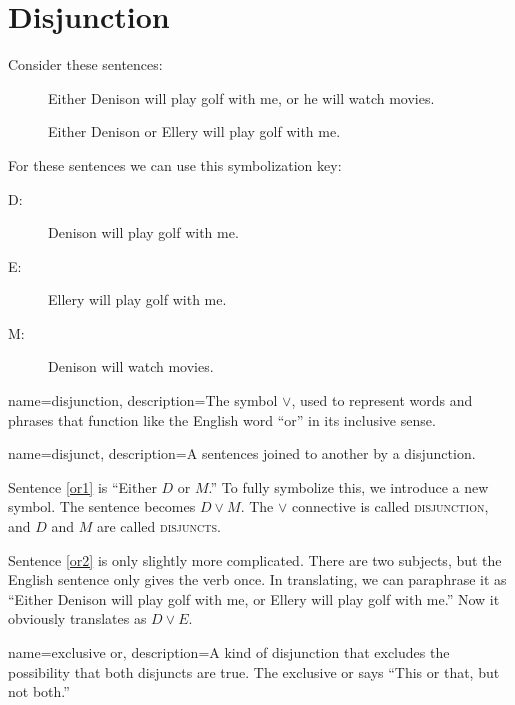 
\section{Disjunction}
Consider these sentences:
\begin{description}
\item[]Either Denison will play golf with me, or he will watch movies.
\item[]Either Denison or Ellery will play golf with me.
\end{description}

For these sentences we can use this symbolization key:

\begin{description}
\item[D:] Denison will play golf with me.
\item[E:] Ellery will play golf with me.
\item[M:] Denison will watch movies.
\end{description}

{
name=disjunction,
description={The symbol $\lor$, used to represent words and phrases that function like the English word ``or'' in its inclusive sense.}
}

{
name=disjunct,
description={A sentences joined to another by a disjunction.}
}



Sentence \ref{or1} is ``Either $D$ or $M$.'' To fully symbolize this, we introduce a new symbol. The sentence becomes $D \lor M$. The $\lor$ connective is called \textsc{\gls{disjunction}}, \label{def:disjunction} and $D$ and $M$ are called \textsc{\glspl{disjunct}}. \label{def:disjunct}

Sentence \ref{or2} is only slightly more complicated. There are two subjects, but the English sentence only gives the verb once. In translating, we can paraphrase it as ``Either Denison will play golf with me, or Ellery will play golf with me.'' Now it obviously translates as $D \lor E$.


{
name=exclusive or,
description={A kind of disjunction that excludes the possibility that both disjuncts are true. The exclusive or says ``This or that, but not both.''}
}

